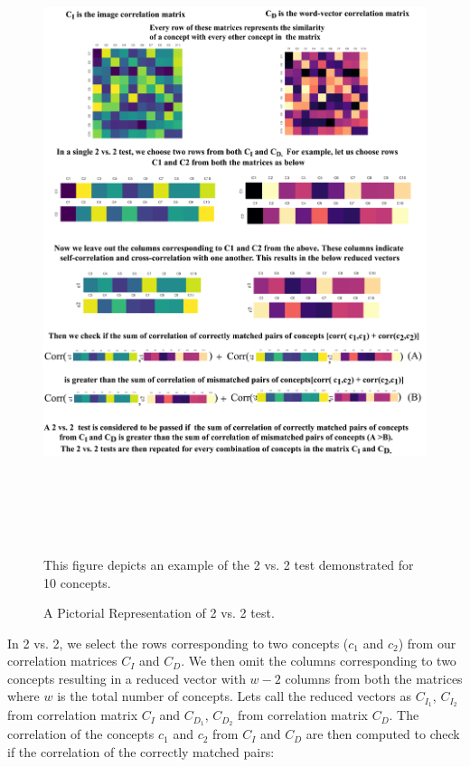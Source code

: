 \begin{figure}[!b]
\centering
\includegraphics[width=14cm, height=18cm]{Figures/replacement}
\caption{A Pictorial Representation of 2 vs. 2 test.}
\label{2 vs 2}
This figure depicts an example of the 2 vs. 2 test demonstrated for 10 concepts.
\end{figure}
\newpage

In 2 vs. 2, we select the rows corresponding to two concepts ($c_1$ and $c_2$) from our correlation matrices $C_I$ and  $C_D$. We then omit the columns corresponding to two concepts resulting in a reduced vector with $w-2$ columns from both the matrices where $w$ is the total number of concepts. Lets call the reduced vectors as
$C_{I_1}$, $C_{I_2}$ from correlation matrix $C_I$ and $C_{D_1}$, $C_{D_2}$ from correlation matrix $C_D$. The correlation of the concepts $c_1$ and $c_2$ from $C_I$ and  $C_D$  are then computed to check if the correlation of the correctly matched pairs:

